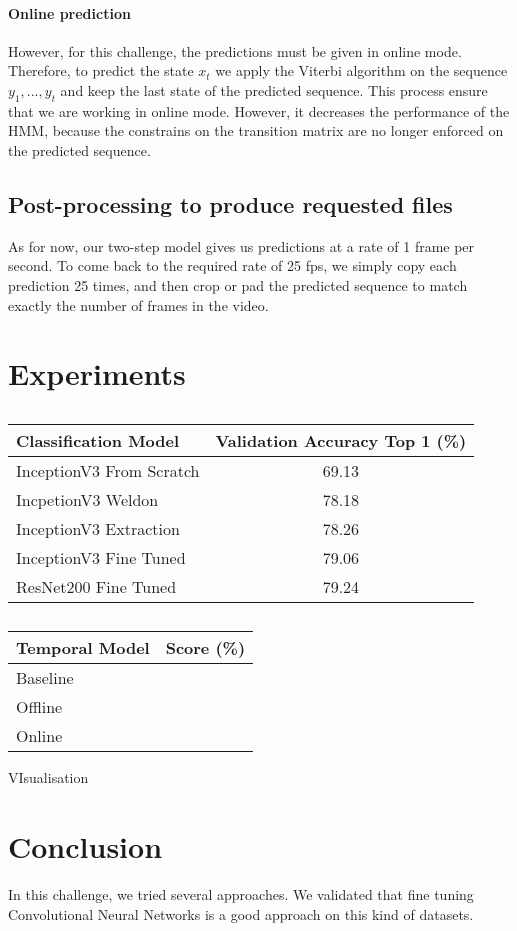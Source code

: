 \documentclass[10pt,twocolumn,letterpaper]{article}
\begin{document}
\paragraph{Online prediction} However, for this challenge, the predictions must
be given in online mode. Therefore, to predict the state
$x_t$ we apply the Viterbi algorithm on the sequence $y_1,...,y_t$ and keep the
last state of the predicted sequence. This process ensure that we are working in online
mode. However, it decreases the performance of the HMM, because the constrains on the transition
matrix are no longer enforced on the predicted sequence.

\subsection{Post-processing to produce requested files}

As for now, our two-step model gives us predictions at a rate of 1 frame per second. To come
back to the required rate of 25 fps, we simply copy each prediction 25 times, and
then crop or pad the predicted sequence to match exactly the number of frames in
the video.

\section{Experiments}


\begin{table}
	\begin{center}
		\begin{tabular}{|l|c|}
			\hline
			Classification Model & Validation Accuracy Top 1 (\%) \\
			\hline\hline
			InceptionV3 From Scratch & 69.13 \\
			IncpetionV3 Weldon & 78.18 \\
			InceptionV3 Extraction & 78.26 \\
			InceptionV3 Fine Tuned & 79.06 \\
			ResNet200 Fine Tuned & 79.24 \\
			\hline
		\end{tabular}
	\end{center}
	\caption{}
\end{table}


\begin{table}
	\begin{center}
		\begin{tabular}{|l|c|}
			\hline
			Temporal Model & Score (\%) \\
			\hline\hline
			Baseline &  \\
			Offline &  \\
			Online & \\
			\hline
		\end{tabular}
	\end{center}
	\caption{}
\end{table}


VIsualisation



\section{Conclusion}

In this challenge, we tried several approaches. We validated that fine tuning Convolutional Neural Networks is a good approach on this kind of datasets.






{\small


}
\end{document}
